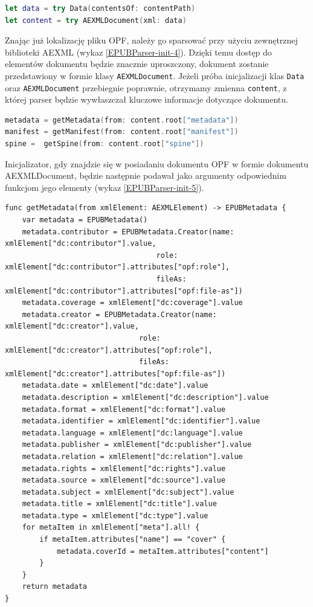 \begin{lstlisting}[firstnumber=14, language=swift,caption={Parsowanie pliku \textit{content.opf}},label=EPUBParser-init-4]
let data = try Data(contentsOf: contentPath)
let content = try AEXMLDocument(xml: data)
\end{lstlisting}

Znając już lokalizację pliku OPF, należy go sparsować przy użyciu zewnętrznej biblioteki AEXML (wykaz \ref{EPUBParser-init-4}). Dzięki temu dostęp do elementów dokumentu będzie znacznie uproszczony, dokument zostanie przedstawiony w formie klasy \texttt{AEXMLDocument}. Jeżeli próba inicjalizacji klas \texttt{Data} oraz \texttt{AEXMLDocument} przebiegnie poprawnie, otrzymamy zmienna \texttt{content}, z której parser będzie wywłaszczał kluczowe informacje dotyczące dokumentu.

\begin{lstlisting}[firstnumber=16, language=swift, caption={Wywołanie metod protkołu},label=EPUBParser-init-5]
metadata = getMetadata(from: content.root["metadata"])
manifest = getManifest(from: content.root["manifest"])
spine =  getSpine(from: content.root["spine"])
\end{lstlisting}

Inicjalizator, gdy znajdzie się w posiadaniu dokumentu OPF w formie dokumentu AEXMLDocument, będzie następnie podawał jako argumenty odpowiednim funkcjom jego elementy (wykaz \ref{EPUBParser-init-5}).

\begin{lstlisting}[caption={Implementacja metody \texttt{getMetadata(from xmlElement:)}},language=swift-reference,label=getMetadata]
func getMetadata(from xmlElement: AEXMLElement) -> EPUBMetadata {
    var metadata = EPUBMetadata()
    metadata.contributor = EPUBMetadata.Creator(name: xmlElement["dc:contributor"].value,
                                   role: xmlElement["dc:contributor"].attributes["opf:role"],
                                   fileAs: xmlElement["dc:contributor"].attributes["opf:file-as"])
    metadata.coverage = xmlElement["dc:coverage"].value
    metadata.creator = EPUBMetadata.Creator(name: xmlElement["dc:creator"].value,
                               role: xmlElement["dc:creator"].attributes["opf:role"],
                               fileAs: xmlElement["dc:creator"].attributes["opf:file-as"])
    metadata.date = xmlElement["dc:date"].value
    metadata.description = xmlElement["dc:description"].value
    metadata.format = xmlElement["dc:format"].value
    metadata.identifier = xmlElement["dc:identifier"].value
    metadata.language = xmlElement["dc:language"].value
    metadata.publisher = xmlElement["dc:publisher"].value
    metadata.relation = xmlElement["dc:relation"].value
    metadata.rights = xmlElement["dc:rights"].value
    metadata.source = xmlElement["dc:source"].value
    metadata.subject = xmlElement["dc:subject"].value
    metadata.title = xmlElement["dc:title"].value
    metadata.type = xmlElement["dc:type"].value
    for metaItem in xmlElement["meta"].all! {
        if metaItem.attributes["name"] == "cover" {
            metadata.coverId = metaItem.attributes["content"]
        }
    }
    return metadata
}
\end{lstlisting}

